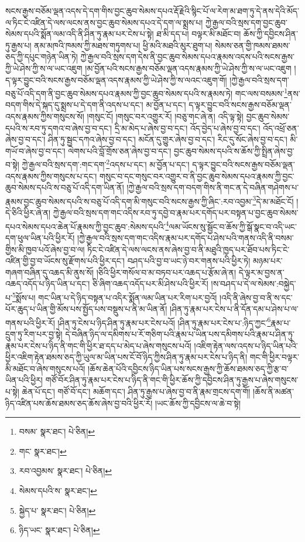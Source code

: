 སངས་རྒྱས་བཅོམ་ལྡན་འདས་དེ་དག་གིས་བྱང་ཆུབ་སེམས་དཔའ་རྡོ་རྗེའི་སྙིང་པོ་ལ་རེག་མ་ཐག་ཏུ་དེ་ནས་དེའི་མོད་ལ་ཏིང་ངེ་འཛིན་དེ་ལས་ལངས་ནས་བྱང་ཆུབ་སེམས་དཔའ་དེ་དག་ལ་སྨྲས་པ། ཀྱེ་རྒྱལ་བའི་སྲས་དག་བྱང་ཆུབ་སེམས་དཔའི་སྨོན་ལམ་འདི་ནི་ཤིན་ཏུ་རྣམ་པར་ངེས་པ་སྟེ། ཐ་མི་དད་པ། བལྟར་མི་མཐོང་བ། ཆོས་ཀྱི་དབྱིངས་ཤིན་ཏུ་རྒྱས་པ། ནམ་མཁའི་ཁམས་ཀྱི་མཐས་གཏུགས་པ། ཕྱི་མའི་མཐའི་མུར་ཐུག་པ། སེམས་ཅན་གྱི་ཁམས་ཐམས་ཅད་ཀྱི་དཔུང་གཉེན་ཡིན་ཏེ། ཀྱེ་རྒྱལ་བའི་སྲས་དག་དེས་ནི་བྱང་ཆུབ་སེམས་དཔའ་རྣམས་འདས་པའི་སངས་རྒྱས་ཀྱི་ཡེ་ཤེས་ཀྱི་ས་ལ་ཡང་འཇུག །མ་བྱོན་པའི་སངས་རྒྱས་བཅོམ་ལྡན་འདས་རྣམས་ཀྱི་ཡེ་ཤེས་ཀྱི་ས་ལ་ཡང་འཇུག །ད་ལྟར་བྱུང་བའི་སངས་རྒྱས་བཅོམ་ལྡན་འདས་རྣམས་ཀྱི་ཡེ་ཤེས་ཀྱི་ས་ལའང་འཇུག་གོ། །ཀྱེ་རྒྱལ་བའི་སྲས་དག་བཅུ་པོ་འདི་དག་ནི་བྱང་ཆུབ་སེམས་དཔའ་རྣམས་ཀྱི་བྱང་ཆུབ་སེམས་དཔའི་ས་རྣམས་ཏེ། གང་ལས་བསམས་\footnote{བསམ་  སྣར་ཐང་།  པེ་ཅིན། }ནས་བདག་གིས་དེ་སྐད་དུ་སྨྲས་པ་དེ་དག་ནི་འདས་པ་དང་། མ་བྱོན་པ་དང་། ད་ལྟར་བྱུང་བའི་སངས་རྒྱས་བཅོམ་ལྡན་འདས་རྣམས་ཀྱིས་གསུངས་སོ། །གསུང་ངོ། །གསུང་བར་འགྱུར་རོ། །བཅུ་གང་ཞེ་ན། འདི་ལྟ་སྟེ། བྱང་ཆུབ་སེམས་དཔའི་ས་རབ་ཏུ་དགའ་བ་ཞེས་བྱ་བ་དང་། དྲི་མ་མེད་པ་ཞེས་བྱ་བ་དང་། འོད་བྱེད་པ་ཞེས་བྱ་བ་དང་། འོད་འཕྲོ་ཅན་ཞེས་བྱ་བ་དང་། ཤིན་ཏུ་སྦྱང་དཀའ་ཞེས་བྱ་བ་དང་། མངོན་དུ་གྱུར་ཞེས་བྱ་བ་དང་། རིང་དུ་སོང་ཞེས་བྱ་བ་དང་། མི་གཡོ་བ་ཞེས་བྱ་བ་དང་། ལེགས་པའི་བློ་གྲོས་ཅན་ཞེས་བྱ་བ་དང་། བྱང་ཆུབ་སེམས་དཔའི་ས་ཆོས་ཀྱི་སྤྲིན་ཞེས་བྱ་བ་སྟེ། ཀྱེ་རྒྱལ་བའི་སྲས་དག་:གང་དག་\footnote{གང་  སྣར་ཐང་། }འདས་པ་དང་། མ་བྱོན་པ་དང་། ད་ལྟར་བྱུང་བའི་སངས་རྒྱས་བཅོམ་ལྡན་འདས་རྣམས་ཀྱིས་གསུངས་པ་དང་། གསུང་བ་དང་གསུང་བར་འགྱུར་བ་ནི་བྱང་ཆུབ་སེམས་དཔའ་རྣམས་ཀྱི་བྱང་ཆུབ་སེམས་དཔའི་ས་བཅུ་པོ་འདི་དག་ཡིན་ནོ། །ཀྱེ་རྒྱལ་བའི་སྲས་དག་བདག་གིས་ནི་གང་ན་དེ་བཞིན་གཤེགས་པ་རྣམས་བྱང་ཆུབ་སེམས་དཔའི་ས་བཅུ་པོ་འདི་དག་མི་གསུང་བའི་སངས་རྒྱས་ཀྱི་ཞིང་:རབ་འབྱམ་\footnote{རབ་འབྱམས་  སྣར་ཐང་།  པེ་ཅིན། }དེ་མ་མཐོང་ངོ། །དེ་ཅིའི་ཕྱིར་ཞེ་ན། ཀྱེ་རྒྱལ་བའི་སྲས་དག་གང་འདིས་རབ་ཏུ་དབྱེ་བ་རྣམ་པར་དགོད་པར་བསྟན་པ་བྱང་ཆུབ་སེམས་དཔའ་སེམས་དཔའ་ཆེན་པོ་རྣམས་ཀྱི་བྱང་ཆུབ་:སེམས་དཔའི་\footnote{སེམས་དཔའི་ས་  སྣར་ཐང་། }ལམ་ཡོངས་སུ་སྦྱོང་བ་ཆོས་ཀྱི་སྒོ་སྣང་བ་འདི་ཡང་དག་ཕུལ་ཡིན་པའི་ཕྱིར་རོ། །ཀྱེ་རྒྱལ་བའི་སྲས་དག་གང་འདིས་རྣམ་པར་དགོད་པ་ཤེས་པའི་གནས་འདི་ནི་བསམ་གྱིས་མི་ཁྱབ་པའོ་ཞེས་བྱ་བ་ལ། ཏིང་ངེ་འཛིན་དེ་ལས་ལངས་ནས་ཞེས་བྱ་བ་ནི་མཐུའི་ཁྱད་པར་ཐོབ་པས་ཏིང་ངེ་འཛིན་གྱི་བྱ་བ་ཡོངས་སུ་རྫོགས་པའི་ཕྱིར་དང་། བཤད་པའི་བྱ་བ་ཡང་ཉེ་བར་གནས་པའི་ཕྱིར་ཏེ། མཉམ་པར་གཞག་བཞིན་དུ་འཆད་མི་ནུས་སོ། །ཅིའི་ཕྱིར་གསོལ་བ་མ་བཏབ་པར་འཆད་པ་རྩོམ་ཞེ་ན། དེ་ལྟར་མ་བྱས་ན་འཆད་འདོད་པ་ཉིད་ཡིན་པ་དང་། ཅི་ཞིག་འཆད་འདོད་པར་མི་ཤེས་པའི་ཕྱིར་རོ། །ས་བཤད་པ་དེ་ལ་སེམས་:བསྐྱེད་པ་\footnote{སྐྱེད་པ་  སྣར་ཐང་།  པེ་ཅིན། }སྨོས་པ། གང་ཡིན་པ་དེ་ཉིད་བསྟན་པ་འདིར་སྨོན་ལམ་ཡིན་པར་རིག་པར་བྱའོ། །འདི་ནི་ཞེས་བྱ་བ་ནི་ས་དང་པོར་ཆུད་པ་ཡིན་གྱི་མོས་པས་སྤྱོད་པས་བསྡུས་པ་ནི་མ་ཡིན་ནོ། །ཤིན་ཏུ་རྣམ་པར་ངེས་པ་ནི་དོན་དམ་པ་ཤེས་པ་ལ་གནས་པའི་ཕྱིར་རོ། །ཤིན་ཏུ་ངེས་པ་ཉིད་ཤིན་ཏུ་རྣམ་པར་ངེས་པའོ། །ཤིན་ཏུ་རྣམ་པར་ངེས་པ་:ཉིད་ཀྱང་\footnote{ཉིད་ཡང་  སྣར་ཐང་།  པེ་ཅིན། }རྣམ་པ་དྲུག་ཏུ་རིག་པར་བྱ་སྟེ། དེ་བཞིན་ཉིད་ལ་དམིགས་པ་རོ་གཅིག་པའི་རྣམ་པ་ཡིན་པས་དམིགས་པའི་རྣམ་པ་ཤིན་ཏུ་རྣམ་པར་ངེས་པ་ཉིད་ནི་གང་གི་ཕྱིར་ཐ་དད་པ་མེད་པ་ཞེས་གསུངས་པའོ། །འཇིག་རྟེན་ལས་འདས་པ་ཉིད་ཡིན་པའི་ཕྱིར་འཇིག་རྟེན་ཐམས་ཅད་ཀྱི་ཡུལ་མ་ཡིན་པས་ངོ་བོ་ཉིད་ཀྱིས་ཤིན་ཏུ་རྣམ་པར་ངེས་པ་ཉིད་ནི། གང་གི་ཕྱིར་བལྟར་མི་མཐོང་བ་ཞེས་གསུངས་པའོ། །ཆོས་ཆེན་པོའི་དབྱིངས་ཉིད་ཡིན་པས་སངས་རྒྱས་ཀྱི་ཆོས་ཐམས་ཅད་ཀྱི་རྩ་བ་ཡིན་པའི་ཕྱིར། གཙོ་བོར་ཤིན་ཏུ་རྣམ་པར་ངེས་པ་ཉིད་ནི་གང་གི་ཕྱིར་ཆོས་ཀྱི་དབྱིངས་ཤིན་ཏུ་རྒྱས་པ་ཞེས་གསུངས་པ་སྟེ། ཆེན་པོ་དང་། གཙོ་བོ་དང་། མཆོག་དང་། ཤིན་ཏུ་རྒྱས་པ་ཞེས་བྱ་བ་ནི་རྣམ་གྲངས་དག་གོ། །ཆོས་ནི་མཚན་ཉིད་འཛིན་པས་ཆོས་ཐམས་ཅད་ཆོས་ཞེས་བྱ་བའི་ཕྱིར་རོ། །ཡང་ཆོས་ཀྱི་དབྱིངས་ལ་ཆེ་བ་སྟེ། 
